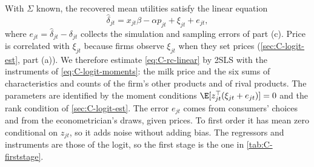 With $\Sigma$ known, the recovered mean utilities satisfy the linear equation
\begin{equation}\label{eq:C-rc-linear}
  \hat\delta_{jt} = x_{jt}\beta - \alpha p_{jt} + \xi_{jt} + e_{jt} ,
\end{equation}
where $e_{jt} = \hat\delta_{jt} - \delta_{jt}$ collects the simulation and sampling errors of part (c). Price is
correlated with $\xi_{jt}$ because firms observe $\xi_{jt}$ when they set prices (\cref{sec:C-logit-est}, part (a)).
We therefore estimate \eqref{eq:C-rc-linear} by 2SLS with the instruments of \eqref{eq:C-logit-moments}: the milk price
and the six sums of characteristics and counts of the firm's other products and of rival products. The parameters are
identified by the moment conditions $\E[z_{jt}^\top(\xi_{jt} + e_{jt})] = 0$ and the rank condition of
\cref{sec:C-logit-est}. The error $e_{jt}$ comes from consumers' choices and from the econometrician's draws, given
prices. To first order it has mean zero conditional on $z_{jt}$, so it adds noise without adding bias. The
regressors and instruments are those of the logit, so the first stage is the one in \cref{tab:C-firststage}.

